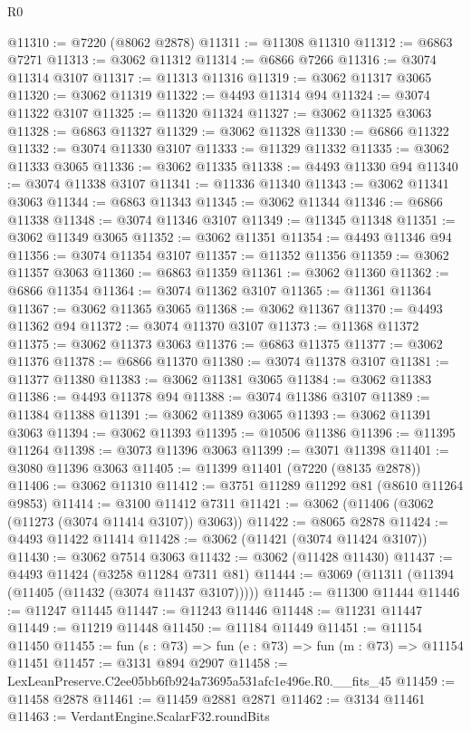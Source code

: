 \begin{lexlean}{R0}
\begin{coremodule}
@11310 := @7220 (@8062 @2878)
@11311 := @11308 @11310
@11312 := @6863 @7271
@11313 := @3062 @11312
@11314 := @6866 @7266
@11316 := @3074 @11314 @3107
@11317 := @11313 @11316
@11319 := @3062 @11317 @3065
@11320 := @3062 @11319
@11322 := @4493 @11314 @94
@11324 := @3074 @11322 @3107
@11325 := @11320 @11324
@11327 := @3062 @11325 @3063
@11328 := @6863 @11327
@11329 := @3062 @11328
@11330 := @6866 @11322
@11332 := @3074 @11330 @3107
@11333 := @11329 @11332
@11335 := @3062 @11333 @3065
@11336 := @3062 @11335
@11338 := @4493 @11330 @94
@11340 := @3074 @11338 @3107
@11341 := @11336 @11340
@11343 := @3062 @11341 @3063
@11344 := @6863 @11343
@11345 := @3062 @11344
@11346 := @6866 @11338
@11348 := @3074 @11346 @3107
@11349 := @11345 @11348
@11351 := @3062 @11349 @3065
@11352 := @3062 @11351
@11354 := @4493 @11346 @94
@11356 := @3074 @11354 @3107
@11357 := @11352 @11356
@11359 := @3062 @11357 @3063
@11360 := @6863 @11359
@11361 := @3062 @11360
@11362 := @6866 @11354
@11364 := @3074 @11362 @3107
@11365 := @11361 @11364
@11367 := @3062 @11365 @3065
@11368 := @3062 @11367
@11370 := @4493 @11362 @94
@11372 := @3074 @11370 @3107
@11373 := @11368 @11372
@11375 := @3062 @11373 @3063
@11376 := @6863 @11375
@11377 := @3062 @11376
@11378 := @6866 @11370
@11380 := @3074 @11378 @3107
@11381 := @11377 @11380
@11383 := @3062 @11381 @3065
@11384 := @3062 @11383
@11386 := @4493 @11378 @94
@11388 := @3074 @11386 @3107
@11389 := @11384 @11388
@11391 := @3062 @11389 @3065
@11393 := @3062 @11391 @3063
@11394 := @3062 @11393
@11395 := @10506 @11386
@11396 := @11395 @11264
@11398 := @3073 @11396 @3063
@11399 := @3071 @11398
@11401 := @3080 @11396 @3063
@11405 := @11399 @11401 (@7220 (@8135 @2878))
@11406 := @3062 @11310
@11412 := @3751 @11289 @11292 @81 (@8610 @11264 @9853)
@11414 := @3100 @11412 @7311
@11421 := @3062 (@11406 (@3062 (@11273 (@3074 @11414 @3107)) @3063))
@11422 := @8065 @2878
@11424 := @4493 @11422 @11414
@11428 := @3062 (@11421 (@3074 @11424 @3107))
@11430 := @3062 @7514 @3063
@11432 := @3062 (@11428 @11430)
@11437 := @4493 @11424 (@3258 @11284 @7311 @81)
@11444 := @3069 (@11311 (@11394 (@11405 (@11432 (@3074 @11437 @3107)))))
@11445 := @11300 @11444
@11446 := @11247 @11445
@11447 := @11243 @11446
@11448 := @11231 @11447
@11449 := @11219 @11448
@11450 := @11184 @11449
@11451 := @11154 @11450
@11455 := fun (s : @73) => fun (e : @73) => fun (m : @73) => @11154 @11451
@11457 := @3131 @894 @2907
@11458 := LexLeanPreserve.C2ee05bb6fb924a73695a531afc1e496e.R0.__fits_45
@11459 := @11458 @2878
@11461 := @11459 @2881 @2871
@11462 := @3134 @11461
@11463 := VerdantEngine.ScalarF32.roundBits

\end{coremodule}
\end{lexlean}
